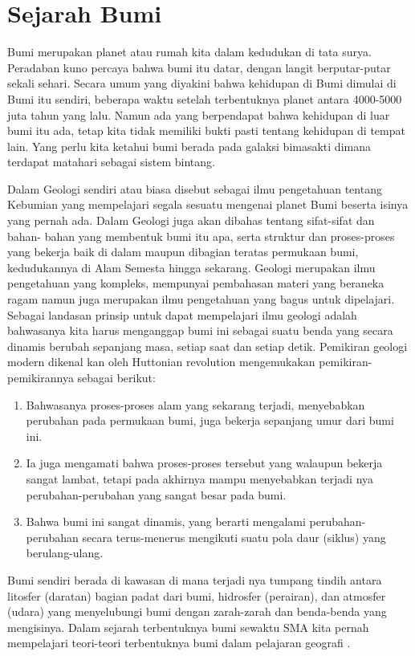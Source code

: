 
\section{Sejarah Bumi}
Bumi merupakan planet atau rumah kita dalam kedudukan di tata surya. Peradaban kuno percaya bahwa bumi itu datar, dengan langit berputar-putar sekali sehari. Secara umum yang diyakini bahwa kehidupan di Bumi dimulai di Bumi itu sendiri, beberapa waktu setelah terbentuknya planet antara 4000-5000 juta tahun yang lalu. Namun ada yang berpendapat bahwa kehidupan di luar bumi itu ada, tetap kita tidak memiliki bukti pasti tentang kehidupan di tempat lain. Yang perlu kita ketahui bumi berada pada galaksi bimasakti dimana terdapat matahari sebagai sistem bintang.

Dalam Geologi sendiri atau biasa disebut sebagai ilmu pengetahuan tentang Kebumian yang mempelajari segala sesuatu mengenai planet Bumi beserta isinya yang pernah ada. Dalam Geologi juga akan dibahas tentang sifat-sifat dan bahan- bahan yang membentuk bumi itu apa, serta struktur dan proses-proses yang bekerja baik di dalam maupun dibagian teratas permukaan bumi, kedudukannya di Alam Semesta hingga sekarang. Geologi merupakan ilmu pengetahuan yang kompleks, mempunyai pembahasan materi yang beraneka ragam namun juga merupakan ilmu pengetahuan yang bagus untuk dipelajari. Sebagai landasan prinsip untuk dapat mempelajari ilmu geologi adalah bahwasanya kita harus menganggap bumi ini sebagai suatu benda yang secara dinamis berubah sepanjang masa, setiap saat dan setiap detik. 
Pemikiran geologi modern dikenal kan oleh Huttonian revolution mengemukakan pemikiran-pemikirannya sebagai berikut:
\begin{enumerate}
\item Bahwasanya proses-proses alam yang sekarang terjadi, menyebabkan perubahan pada permukaan bumi, juga bekerja sepanjang umur dari bumi ini. 
\item Ia juga mengamati bahwa proses-proses tersebut yang walaupun bekerja sangat lambat, tetapi pada akhirnya mampu menyebabkan terjadi nya perubahan-perubahan yang sangat besar pada bumi. 
\item Bahwa bumi ini sangat dinamis, yang berarti mengalami perubahan-perubahan secara terus-menerus mengikuti suatu pola daur (siklus) yang berulang-ulang.
\end{enumerate}
Bumi sendiri berada di kawasan di mana terjadi nya tumpang tindih antara litosfer (daratan) bagian padat dari bumi, hidrosfer (perairan), dan atmosfer (udara) yang menyelubungi bumi dengan zarah-zarah dan benda-benda yang mengisinya.
Dalam sejarah terbentuknya bumi sewaktu SMA kita pernah mempelajari teori-teori terbentuknya bumi dalam pelajaran geografi \cite{wetherill1990formation}.

